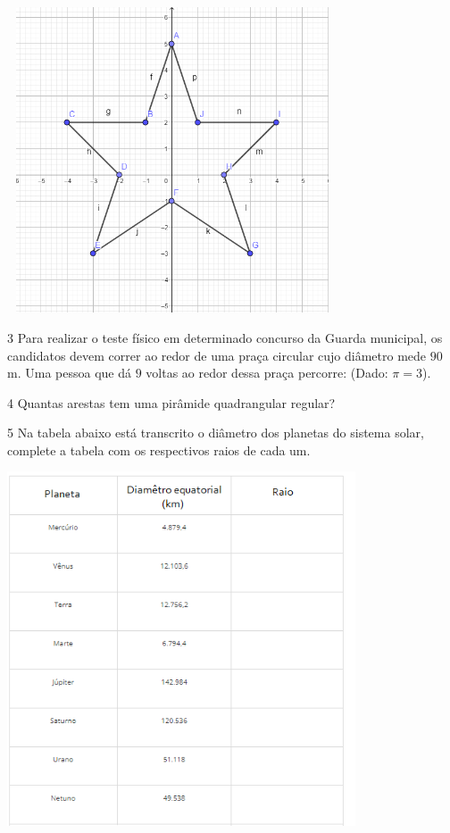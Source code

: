 \includegraphics[width=3.85417in,height=3.56597in]{./imgSAEB_6_MAT/media/image45.png}

\num{3}  Para realizar o teste físico em determinado concurso da Guarda
municipal, os candidatos devem correr ao redor de uma praça circular
cujo diâmetro mede $90$ m. Uma pessoa que dá $9$ voltas ao redor dessa praça
percorre: (Dado: $π = 3$).


\num{4}  Quantas arestas tem uma pirâmide quadrangular regular?



\num{5}  Na tabela abaixo está transcrito o diâmetro dos planetas do sistema
solar, complete a tabela com os respectivos raios de cada um.

\includegraphics[width=4.05833in,height=4.13212in]{./imgSAEB_6_MAT/media/image48.png}

